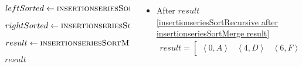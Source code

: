 \begin{frame}[containsverbatim]{\insertionseriesexampleframe}
\begin{columns}[c]
\begin{column}{0.4\textwidth}
{\begin{minipage}[c]{\textwidth}
\begin{algorithm}[H]
\begin{algorithmic}[1]
                                            \label{insertionseriesSortRecursive before leftSorted}
                                            \State $leftSorted \gets \Call{insertionseriesSortRecursive}{left}$
                                            \label{insertionseriesSortRecursive after leftsorted}
                                            
                                            \label{insertionseriesSortRecursive before rightSorted}
                                            \State $rightSorted \gets \Call{insertionseriesSortRecursive}{right}$
                                            \label{insertionseriesSortRecursive after rightsorted}
                                            
                                            \label{insertionseriesSortRecursive before insertionseriesSortMerge result}
                                            \State $result \gets \Call{insertionseriesSortMerge}{leftSorted, rightSorted}$
                                            \label{insertionseriesSortRecursive after insertionseriesSortMerge result}
                    
                                            \State \Return $result$
                                        \EndFunction
                                    \end{algorithmic}
                                \end{algorithm}
                            \endgroup
                        \end{minipage}
                    }
                \end{column}

                \begin{column}{0.6\textwidth}
                        \begin{itemize}
                            \item After $result$ \cref{insertionseriesSortRecursive after insertionseriesSortMerge result}
                            \begin{align*}
                                result = \begin{bmatrix}\left<0, A\right> & \left<4, D\right> & \left<6, F\right> & \left<8, I\right>\end{bmatrix}
                            \end{align*}
                        \end{itemize}
                \end{column}
            \end{columns}
        \end{frame}

